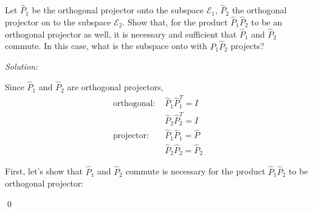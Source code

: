 \documentclass[12pt,a4paper]{article}
\newenvironment{problem}[2][Problem]{\begin{trivlist}
\item[\hskip \labelsep {\bfseries #1}\hskip \labelsep {\bfseries #2.}]}{\end{trivlist}}
\newenvironment{sol}
    {\emph{Solution:}
    }
    {
    \qed
    }
\begin{document}
\begin{problem}{3}
[C-T exercise 2-5] Let $\hat{P}_1$ be the orthogonal projector onto the subspace $\mathcal{E}_1$, $\hat{P}_2$ the orthogonal projector on to the subspace $\mathcal{E}_2$. Show that, for the product $\hat{P}_1\hat{P}_2$ to be an orthogonal projector as well, it is necessary and sufficient that $\hat{P}_1$ and $\hat{P}_2$ commute. In this case, what is the subspace onto with $\hat{P}_1\hat{P}_2$ projects?
\end{problem}
\begin{sol}
Since $\hat{P}_1$ and $\hat{P}_2$ are orthogonal projectors,
\begin{align}
\text{orthogonal: }&\hat{P}_1\hat{P}_1^T=I\\
&\hat{P}_2\hat{P}_2^T=I\\
\text{projector: }&\hat{P}_1\hat{P}_1=\hat{P}\\
&\hat{P}_2\hat{P}_2=\hat{P}_2
\end{align}

First, let's show that $\hat{P}_1$ and $\hat{P}_2$ commute is necessary for the product $\hat{P}_1\hat{P}_2$ to be orthogonal projector:


\end{sol}
\end{document}
